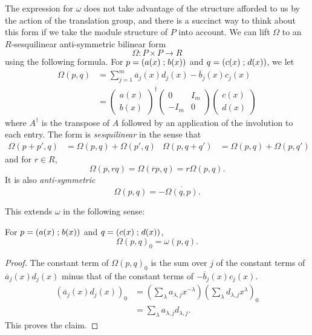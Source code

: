 \documentclass[11pt]{amsart}
\begin{document}
The expression for $\omega$ does not take advantage of the structure afforded to us by the action of the translation group, and there is a succinct way to think about this form if we take the module structure of $P$ into account. We can lift $\Omega$ to an $R$-sesquilinear anti-symmetric bilinear form
\[ \Omega \colon P \times P \to R \]
using the following formula. For $p = (a(x) \mathrel{;} b(x))$ and $q=   (c(x) \mathrel{;} d(x))$, we let
\begin{align*}\Omega( p,q) &= \sum_{j=1}^m \overline{a}_j(x) d_j(x) - \overline{b}_j(x) c_j(x) \\
&=   \begin{pmatrix} {a}(x) \\ {b}(x) \end{pmatrix}^\dagger \begin{pmatrix} 0 & I_m \\ -I_m & 0 \end{pmatrix} \begin{pmatrix} c(x) \\ d(x) \end{pmatrix}
\end{align*}
where $A^\dagger$ is the transpose of $A$ followed by an application of the involution to each entry.
The form is \emph{sesquilinear} in the sense that
\begin{align*}
\Omega(p+p',q) &= \Omega(p,q)+\Omega(p',q) & \Omega(p,q+q') &= \Omega(p,q)+\Omega(p,q')
\end{align*}
and for $r \in R$,
\[\Omega(p,rq) = \Omega(\overline{r}p,q) = r\Omega(p,q).\]
It is also \emph{anti-symmetric}
\[ \Omega(p,q) = -\overline{\Omega(q,p)}.\]

This extends $\omega$ in the following sense:
\begin{lem}
For $p = (a(x) \mathrel{;} b(x))$ and $q=   (c(x) \mathrel{;} d(x))$,
\[\Omega( p,q)_0 =  \omega(p,q).\]
\end{lem}
\begin{proof}
The constant term of $\Omega( p,q)_0$ is the sum over $j$ of the constant terms of $\overline{a}_j(x) d_j(x)$ minus that of the constant terms of $- \overline{b}_j(x) c_j(x)$.
\begin{align*}
 (\overline{a}_j(x) d_j(x))_0
 &= \left(\sum_{\lambda} a_{\lambda,j}x^{-\lambda} \right)\left(\sum_{\lambda} d_{\lambda,j}x^{\lambda} \right)_0  \\
 &= \sum_{\lambda} a_{\lambda,j}d_{\lambda,j}.
 \end{align*}
 This proves the claim.
\end{proof}
\end{document}
